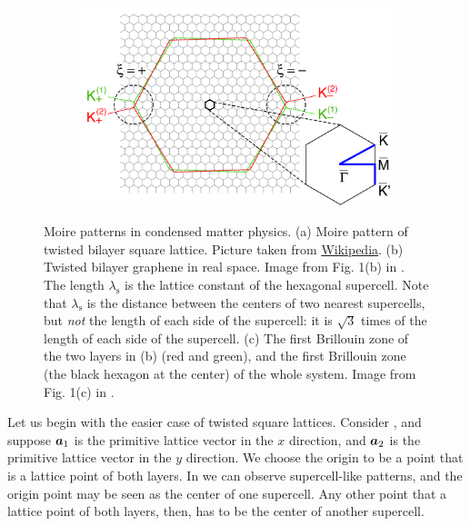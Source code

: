 \documentclass[hyperref, a4paper]{article}
\begin{document}
\begin{figure}
\begin{subfigure}{0.3\textwidth}
        \subcaption{}
        \label{fig:hexagonal-moire}
    \end{subfigure}
    \begin{subfigure}{0.3\textwidth}
        \centering
        \includegraphics[width=\textwidth]{structure/moire-k-graphene.PNG}
        \subcaption{}
        \label{fig:1bz-1}
    \end{subfigure}
    \caption{Moire patterns in condensed matter physics.
    (a) Moire pattern of twisted bilayer square lattice. 
    Picture taken from \href{https://en.wikipedia.org/wiki/Moir\%C3\%A9\_pattern\#/media/File:Moir\%C3\%A9\_grid.svg}{Wikipedia}.
    (b) Twisted bilayer graphene in real space. Image from Fig. 1(b) in \cite{padhi_doped_2018}.
    The length $\lambda_\text{s}$ is the lattice constant of the hexagonal supercell.
    Note that $\lambda_{\text{s}}$ is the distance between the centers of two nearest supercells,
    but \emph{not} the length of each side of the supercell:
    it is $\sqrt{3}$ times of the length of each side of the supercell.
    (c) The first Brillouin zone of the two layers in (b) (red and green),
    and the first Brillouin zone (the black hexagon at the center) of the whole system.
    Image from Fig. 1(c) in \cite{koshino_band_2019}.
    }
\end{figure}

Let us begin with the easier case of twisted square lattices.
Consider , 
and suppose $\vb*{a}_1$ is the primitive lattice vector in the $x$ direction,
and $\vb*{a}_2$ is the primitive lattice vector in the $y$ direction.
We choose the origin to be a point 
that is a lattice point of both layers.
In  we can observe supercell-like patterns,
and the origin point may be seen as the center of one supercell.
Any other point that a lattice point of both layers, then,
has to be the center of another supercell.
\end{document}
